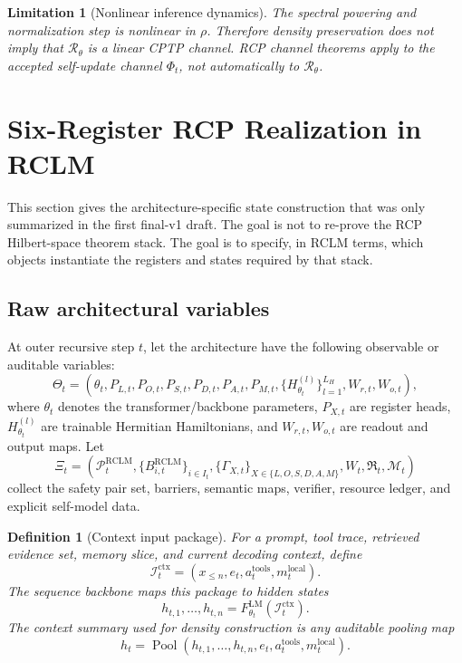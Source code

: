 \documentclass[11pt,a4paper]{article}
\newtheorem{definition}[theorem]{Definition}
\newtheorem{limitation}[theorem]{Limitation}
\newcommand{\Pcal}{\mathcal P}
\newcommand{\Rcal}{\mathcal R}
\newcommand{\Mcal}{\mathcal M}
\newcommand{\RCLM}{\mathrm{RCLM}}
\newcommand{\ctx}{\mathrm{ctx}}
\newcommand{\LM}{\mathrm{LM}}
\newcommand{\tools}{\mathrm{tools}}
\newcommand{\local}{\mathrm{local}}
\begin{document}
\begin{limitation}[Nonlinear inference dynamics]
The spectral powering and normalization step is nonlinear in \(\rho\). Therefore density preservation does not imply that \(\Rcal_{\theta}\) is a linear CPTP channel. RCP channel theorems apply to the accepted self-update channel \(\Phi_t\), not automatically to \(\Rcal_{\theta}\).
\end{limitation}


\section{Six-Register RCP Realization in RCLM}

This section gives the architecture-specific state construction that was only summarized in the first final-v1 draft.  The goal is not to re-prove the RCP Hilbert-space theorem stack.  The goal is to specify, in RCLM terms, which objects instantiate the registers and states required by that stack.

\subsection{Raw architectural variables}

At outer recursive step \(t\), let the architecture have the following observable or auditable variables:
\[
\Theta_t=(\theta_t,P_{L,t},P_{O,t},P_{S,t},P_{D,t},P_{A,t},P_{M,t},\{H_{\theta_t}^{(l)}\}_{l=1}^{L_H},W_{r,t},W_{o,t}),
\]
where \(\theta_t\) denotes the transformer/backbone parameters, \(P_{X,t}\) are register heads, \(H_{\theta_t}^{(l)}\) are trainable Hermitian Hamiltonians, and \(W_{r,t},W_{o,t}\) are readout and output maps.  Let
\[
\Xi_t=(\Pcal_t^{\RCLM},\{B_{i,t}^{\RCLM}\}_{i\in I_t},\{\Gamma_{X,t}\}_{X\in\{L,O,S,D,A,M\}},W_t,\mathfrak R_t,\Mcal_t)
\]
collect the safety pair set, barriers, semantic maps, verifier, resource ledger, and explicit self-model data.

\begin{definition}[Context input package]
For a prompt, tool trace, retrieved evidence set, memory slice, and current decoding context, define
\[
\mathcal I_t^{\ctx}=(x_{\le n},e_t,a_t^{\tools},m_t^{\local}).
\]
The sequence backbone maps this package to hidden states
\[
h_{t,1},\ldots,h_{t,n}=F_{\theta_t}^{\LM}(\mathcal I_t^{\ctx}).
\]
The context summary used for density construction is any auditable pooling map
\[
h_t=\operatorname{Pool}(h_{t,1},\ldots,h_{t,n},e_t,a_t^{\tools},m_t^{\local}).
\]
\end{definition}
\end{document}
